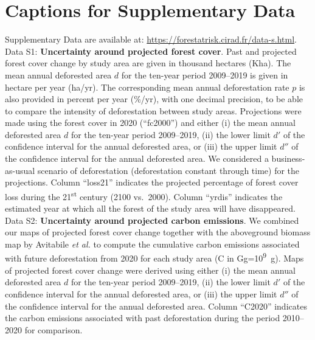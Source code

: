 \documentclass[
  12pt,
]{article}
\begin{document}
\newpage

\hypertarget{captions-for-supplementary-data}{%
\section{Captions for Supplementary Data}\label{captions-for-supplementary-data}}

Supplementary Data are available at: \url{https://forestatrisk.cirad.fr/data-s.html}.\\

Data S1: \textbf{Uncertainty around projected forest cover}. Past and projected forest cover change by study area are given in thousand hectares (Kha). The mean annual deforested area \(d\) for the ten-year period 2009--2019 is given in hectare per year (ha/yr). The corresponding mean annual deforestation rate \(p\) is also provided in percent per year (\%/yr), with one decimal precision, to be able to compare the intensity of deforestation between study areas. Projections were made using the forest cover in 2020 (``fc2000'') and either (i) the mean annual deforested area \(d\) for the ten-year period 2009--2019, (ii) the lower limit \(d'\) of the confidence interval for the annual deforested area, or (iii) the upper limit \(d''\) of the confidence interval for the annual deforested area. We considered a business-as-usual scenario of deforestation (deforestation constant through time) for the projections. Column ``loss21'' indicates the projected percentage of forest cover loss during the 21\textsuperscript{st} century (2100 vs.~2000). Column ``yrdis'' indicates the estimated year at which all the forest of the study area will have disappeared.\\

Data S2: \textbf{Uncertainty around projected carbon emissions}. We combined our maps of projected forest cover change together with the aboveground biomass map by Avitabile \emph{et al.} \citep{Avitabile2016} to compute the cumulative carbon emissions associated with future deforestation from 2020 for each study area (C in Gg=10\textsuperscript{9}~g). Maps of projected forest cover change were derived using either (i) the mean annual deforested area \(d\) for the ten-year period 2009--2019, (ii) the lower limit \(d'\) of the confidence interval for the annual deforested area, or (iii) the upper limit \(d''\) of the confidence interval for the annual deforested area. Column ``C2020'' indicates the carbon emissions associated with past deforestation during the period 2010--2020 for comparison.
\end{document}
